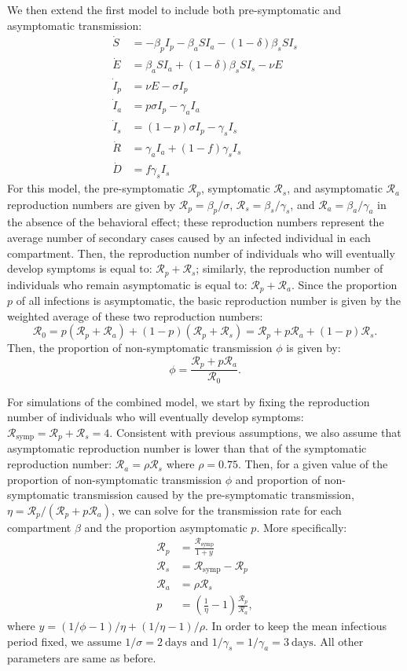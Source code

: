 \documentclass[12pt]{article}
\newcommand{\RR}{\ensuremath{{\mathcal R}}\xspace}
\begin{document}
We then extend the first model to include both pre-symptomatic and asymptomatic transmission:
\begin{align}
\dot{S} &= -\beta_p I_p -\beta_a S I_a -(1-\delta) \beta_s S I_s \\
\dot{E} &= \beta_a S I_a + (1-\delta) \beta_s S I_s - \nu E\\
\dot{I}_p &= \nu E - \sigma I_p\\
\dot{I}_a &= p \sigma I_p - \gamma_a I_a\\
\dot{I}_s &= (1-p) \sigma I_p -\gamma_s I_s\\
\dot{R} &= \gamma_a I_a + (1-f) \gamma_s I_s \\
\dot{D} &= f \gamma_s I_s
\end{align}
For this model, the pre-symptomatic $\RR_p$, symptomatic $\RR_s$, and asymptomatic $\RR_a$ reproduction numbers are given by $\RR_p = \beta_p/\sigma$, $\RR_s=\beta_s/\gamma_s$, and $\RR_a=\beta_a/\gamma_a$ in the absence of the behavioral effect;
these reproduction numbers represent the average number of secondary cases caused by an infected individual in each compartment.
Then, the reproduction number of individuals who will eventually develop symptoms is equal to: $\RR_p + \RR_s$;
similarly, the reproduction number of individuals who remain asymptomatic is equal to: $\RR_p + \RR_a$.
Since the proportion $p$ of all infections is asymptomatic, the basic reproduction number is given by the weighted average of these two reproduction numbers: 
\begin{equation}
\RR_0 = p(\RR_p + \RR_a) + (1-p) (\RR_p + \RR_s) = \RR_p + p \RR_a + (1-p) \RR_s.
\end{equation}
Then, the proportion of non-symptomatic transmission $\phi$ is given by:
\begin{equation}
\phi = \frac{\RR_p + p \RR_a}{\RR_0}.
\end{equation}

For simulations of the combined model, we start by fixing the reproduction number of individuals who will eventually develop symptoms: $\RR_{\textrm{symp}} = \RR_p + \RR_s = 4$. 
Consistent with previous assumptions, we also assume that asymptomatic reproduction number is lower than that of the symptomatic reproduction number: $\RR_a = \rho \RR_s$ where $\rho = 0.75$.
Then, for a given value of the proportion of non-symptomatic transmission $\phi$ and proportion of non-symptomatic transmission caused by the pre-symptomatic transmission, $\eta = \RR_p/(\RR_p + p \RR_a)$, we can solve for the transmission rate for each compartment $\beta$ and the proportion asymptomatic $p$.
More specifically:
\begin{align}
\RR_p &= \frac{\RR_{\textrm{symp}}}{1 + y}\\
\RR_s &= \RR_{\textrm{symp}} - \RR_p\\
\RR_a &=  \rho \RR_s\\
p &= \left(\frac{1}{\eta} - 1 \right) \frac{\RR_p}{\RR_a},
\end{align}
where $y = (1/\phi - 1)/\eta + (1/\eta - 1)/\rho$.
In order to keep the mean infectious period fixed, we assume $1/\sigma=2\ \mathrm{days}$ and $1/\gamma_s=1/\gamma_a=3\ \mathrm{days}$.
All other parameters are same as before.
\end{document}
